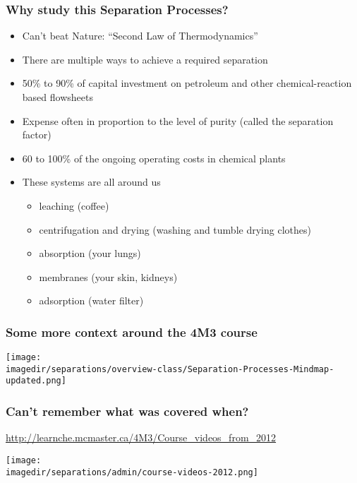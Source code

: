 \begin{frame}\frametitle{Why study this Separation Processes?}
	\begin{itemize}
		\item	Can't beat Nature: ``Second Law of Thermodynamics''
		\item	There are multiple ways to achieve a required separation
		\item	50\% to 90\% of capital investment on petroleum and other chemical-reaction based flowsheets 
		\item	Expense often in proportion to the level of purity (called the separation factor) %
		\item	60 to 100\% of the ongoing operating costs in chemical plants  %
		\item	These systems are all around us
		\begin{itemize}
			\item	leaching (coffee)
			\item	centrifugation and drying (washing and tumble drying clothes)
			\item	absorption (your lungs)
			\item	membranes (your skin, kidneys)
			\item	adsorption (water filter)
		\end{itemize}
	\end{itemize}
\end{frame}

\begin{frame}\frametitle{Some more context around the 4M3 course}
	\begin{center}
		\texttt{[image: \\imagedir/separations/overview-class/Separation-Processes-Mindmap-updated.png]}
	\end{center}
\end{frame}

\begin{frame}\frametitle{Can't remember what was covered when?}
	\begin{exampleblock}{}
		\href{http://learnche.mcmaster.ca/4M3/Course\_videos\_from\_2012}{http://learnche.mcmaster.ca/4M3/Course\_videos\_from\_2012}
	\end{exampleblock}
	\begin{center}
		\texttt{[image: \\imagedir/separations/admin/course-videos-2012.png]}
	\end{center}
\end{frame}


